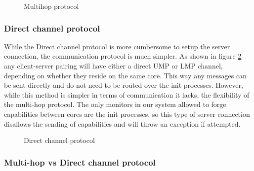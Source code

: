 \begin{figure}[h!]
    \centering
        \scalebox{0.6}{
            
        }
    \caption{Multihop protocol}
    \label{fig:ns_multihop}
\end{figure}



\subsubsection{Direct channel protocol}\label{direc_channel_protocol}

While the Direct channel protocol is more cumbersome to setup the server connection, the communication protocol is much simpler. As shown in figure \ref{fig:ns_direct_protocol} any client-server pairing will have either a direct UMP or LMP channel, depending on whether they reside on the same core. This way any messages can be sent directly and do not need to be routed over the init processes. However, while this method is simpler in terms of communication it lacks, the flexibility of the multi-hop protocol. The only monitors in our system allowed to forge capabilities between cores are the init processes, so this type of server connection disallows the sending of capabilities and will throw an exception if attempted.
\begin{figure}[h!]
    \centering
        \scalebox{0.6}{
            
        }
    \caption{Direct channel protocol}
    \label{fig:ns_direct_protocol}
\end{figure}


\subsubsection{Multi-hop vs Direct channel protocol}

